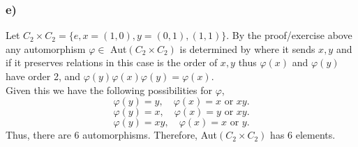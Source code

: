 \documentclass[12pt, letterpaper]{article}
\theoremstyle{definition}
\begin{document}
\subsubsection*{e)}
Let $C_2\times C_2=\{e, x=(1,0),y=(0,1),(1,1)\}$. By the proof/exercise above any automorphism $\varphi \in $ Aut$(C_2 \times C_2)$ is determined by where it sends $x,y$ 
and if it preserves relations in this case is the order of $x,y$ thus $\varphi(x)$ and $\varphi(y)$ have order 2, and $\varphi(y)\varphi(x)\varphi(y)=\varphi(x)$.\\
Given this we have the following possibilities for $\varphi$,\\
\[
\varphi(y)=y, \quad \varphi(x)=x \text{ or } xy.
\]
\[
\varphi(y)=x, \quad \varphi(x)=y \text{ or } xy.
\]
\[
\varphi(y)=xy, \quad \varphi(x)=x \text{ or } y.
\]
Thus, there are $6$ automorphisms.
Therefore, Aut$(C_2 \times C_2)$ has 6 elements.
\end{document}
